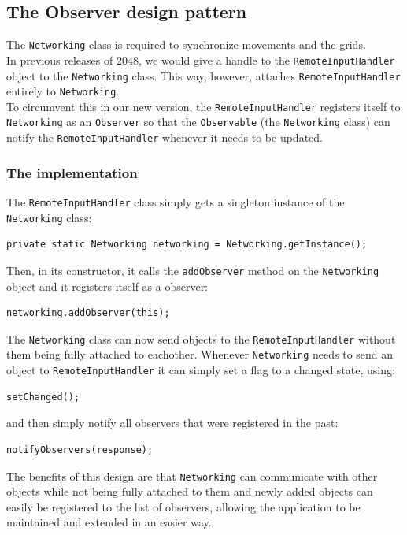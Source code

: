 \documentclass[a4paper,11pt,report]{scrartcl}
\begin{document}
\newpage\subsection{The Observer design pattern}
The \texttt{Networking} class is required to synchronize movements and the grids.\\

In previous releases of 2048, we would give a handle to the
\texttt{RemoteInputHandler} object to the \texttt{Networking} class. This way,
however, attaches \texttt{RemoteInputHandler} entirely to \texttt{Networking}.\\

To circumvent this in our new version, the \texttt{RemoteInputHandler}
registers itself to \texttt{Networking} as an \texttt{Observer} so that the
\texttt{Observable} (the \texttt{Networking} class) can notify the
\texttt{RemoteInputHandler} whenever it needs to be updated.

\subsubsection{The implementation}
The \texttt{RemoteInputHandler} class simply gets a singleton instance of the
\texttt{Networking} class:
\begin{verbatim}
private static Networking networking = Networking.getInstance();
\end{verbatim}
Then, in its constructor, it calls the \texttt{addObserver} method on the
\texttt{Networking} object and it registers itself as a observer:
\begin{verbatim}
networking.addObserver(this);
\end{verbatim}
The \texttt{Networking} class can now send objects to the
\texttt{RemoteInputHandler} without them being fully attached to eachother.
Whenever \texttt{Networking} needs to send an object to
\texttt{RemoteInputHandler} it can simply set a flag to a changed state, using:
\begin{verbatim}
setChanged();
\end{verbatim}
and then simply notify all observers that were registered in the past:
\begin{verbatim}
notifyObservers(response);
\end{verbatim}
The benefits of this design are that \texttt{Networking} can communicate with other
objects while not being fully attached to them and newly added objects can
easily be registered to the list of observers, allowing the application to be
maintained and extended in an easier way.
\end{document}

